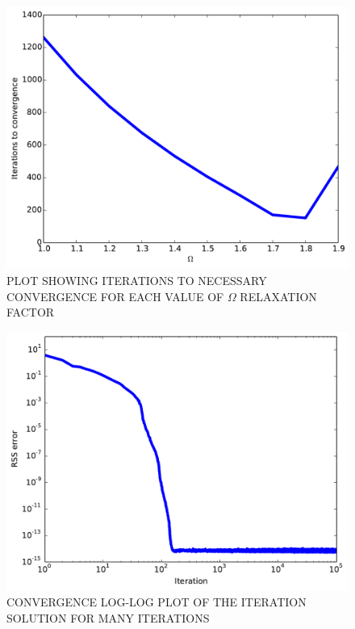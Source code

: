 \documentclass[cleanfoot,cleanhead,twocolumn,10pt,notitlepage]{asme2e}
\begin{document}
\begin{figure}[t]
\begin{center}
\includegraphics[width=\linewidth]{../Project1_code/Iterations.pdf}
\caption{PLOT SHOWING ITERATIONS TO NECESSARY CONVERGENCE FOR EACH VALUE OF $\Omega$ RELAXATION FACTOR}
\label{iterations}
\end{center}
\end{figure}

\begin{figure}[t]
\begin{center}
\includegraphics[width=\linewidth]{../Project1_code/convergence_long.pdf}
\caption{CONVERGENCE LOG-LOG PLOT OF THE ITERATION SOLUTION FOR MANY ITERATIONS}
\label{convergence}
\end{center}
\end{figure}
\end{document}
